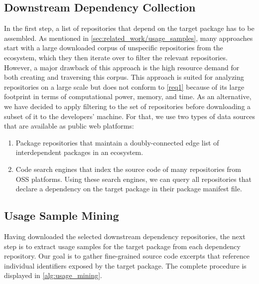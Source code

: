 \documentclass[a4paper,twoside]{article}
\begin{document}
\subsection{Downstream Dependency Collection}
\label{sec:approach/dependency_collection}

In the first step, a list of repositories that depend on the target package has to be assembled.
As mentioned in \cref{sec:related_work/usage_samples}, many approaches start with a large downloaded corpus of unspecific repositories from the ecosystem, which they then iterate over to filter the relevant repositories.
However, a major drawback of this approach is the high resource demand for both creating and traversing this corpus.
This approach is suited for analyzing repositories on a large scale but does not conform to \cref{req1} because of its large footprint in terms of computational power, memory, and time.
As an alternative, we have decided to apply filtering to the set of repositories before downloading a subset of it to the developers' machine.
For that, we use two types of data sources that are available as public web platforms:

\begin{enumerate}[label=(\roman*)]
	\item Package repositories that maintain a doubly-connected edge list of interdependent packages in an ecosystem.
	\item Code search engines that index the source code of many repositories from OSS platforms. Using these search engines, we can query all repositories that declare a dependency on the target package in their package manifest file.
\end{enumerate}

\subsection{Usage Sample Mining}
\label{sec:approach/usage_mining}

Having downloaded the selected downstream dependency repositories, the next step is to extract usage samples for the target package from each dependency repository.
Our goal is to gather fine-grained source code excerpts that reference individual identifiers exposed by the target package.
The complete procedure is displayed in \cref{alg:usage_mining}.
\end{document}
